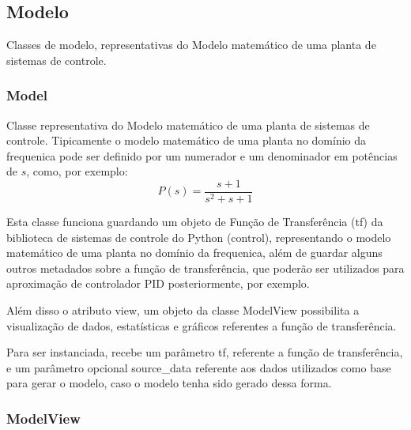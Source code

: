 \subsection{Modelo}

Classes de modelo, representativas do Modelo matemático de uma planta de sistemas de controle.

\subsubsection{Model}\label{subsubsec:devModel}

Classe representativa do Modelo matemático de uma planta de sistemas de controle.
Tipicamente o modelo matemático de uma planta no domínio da frequenica pode ser definido por um numerador e um
denominador em potências de $s$, como, por exemplo:
\begin{equation}
    \label{eq:modelex}
    P(s) = \frac{ s + 1 }{ s^2 + s + 1 }
\end{equation}

Esta classe funciona guardando um objeto de Função de Transferência (tf) da biblioteca de sistemas de controle do Python
(control), representando o modelo matemático de uma planta no domínio da frequenica, além de guardar alguns outros
metadados sobre a função de transferência, que poderão ser utilizados para aproximação de controlador PID
posteriormente, por exemplo.

Além disso o atributo view, um objeto da classe ModelView possibilita a visualização de dados, estatísticas e gráficos
referentes a função de transferência.

Para ser instanciada, recebe um parâmetro tf, referente a função de transferência, e um parâmetro opcional source\_data
referente aos dados utilizados como base para gerar o modelo, caso o modelo tenha sido gerado dessa forma.

\subsubsection{ModelView}\label{subsubsec:devModelView}

